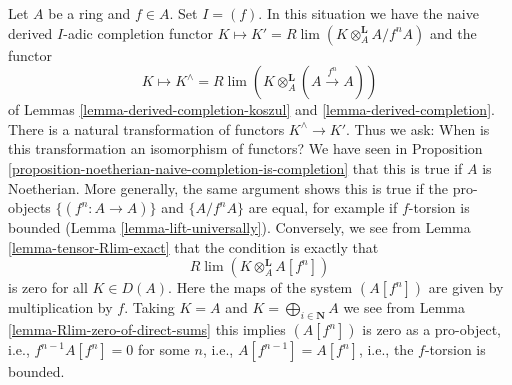 \begin{remark}
\label{remark-when-does-it-work}
Let $A$ be a ring and $f \in A$. Set $I = (f)$. In this situation
we have the naive derived $I$-adic completion functor
$K \mapsto K' = R\lim (K \otimes_A^\mathbf{L} A/f^nA)$ and the functor
$$
K \mapsto K^\wedge = R\lim (K \otimes_A^\mathbf{L} (A \xrightarrow{f^n} A))
$$
of Lemmas \ref{lemma-derived-completion-koszul} and
\ref{lemma-derived-completion}.
There is a natural transformation of functors $K^\wedge \to K'$.
Thus we ask: When is this transformation an isomorphism of functors?
We have seen in
Proposition \ref{proposition-noetherian-naive-completion-is-completion}
that this is true if $A$ is Noetherian. More generally, the same
argument shows this is true if the pro-objects
$\{(f^n : A \to A)\}$ and $\{A/f^nA\}$ are equal, for example
if $f$-torsion is bounded (Lemma \ref{lemma-lift-universally}).
Conversely, we see from Lemma \ref{lemma-tensor-Rlim-exact}
that the condition is exactly that
$$
R\lim (K \otimes_A^\mathbf{L} A[f^n])
$$
is zero for all $K \in D(A)$. Here the maps of the system $(A[f^n])$
are given by multiplication by $f$. Taking $K = A$ and
$K = \bigoplus_{i \in \mathbf{N}} A$ we see from
Lemma \ref{lemma-Rlim-zero-of-direct-sums}
this implies $(A[f^n])$ is zero as a pro-object, i.e.,
$f^{n - 1}A[f^n] = 0$ for some $n$, i.e., $A[f^{n - 1}] = A[f^n]$, i.e.,
the $f$-torsion is bounded.
\end{remark}

